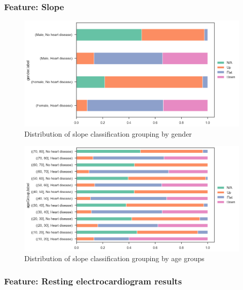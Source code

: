 \subsubsection{Feature: Slope}

\begin{figure}
    \caption{Distribution of slope classification grouping by gender}\label{frequency-slope-gender-percent}
    \centering
    \includegraphics[width=\linewidth]{media/frequency-03-gender-slope.png}
\end{figure}

\begin{figure}
    \caption{Distribution of slope classification grouping by age groups}\label{frequency-slope-agegroup-percent}
    \centering
    \includegraphics[width=\linewidth]{media/frequency-04-agegroup-slope.png}
\end{figure}

\subsubsection{Feature: Resting electrocardiogram results}

